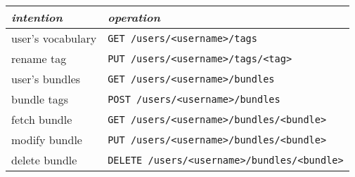 \documentclass{sepslide-soa-faked} %
\begin{document}
\begin{slide}
\begin{flushleft}
\begin{tabular}{@{}ll@{}}
\textit{intention} & \textit{operation} \\ \hline
user's vocabulary & \verb"GET /users/<username>/tags" \\
rename tag & \verb"PUT /users/<username>/tags/<tag>" \\
user's bundles & \verb"GET /users/<username>/bundles" \\
bundle tags & \verb"POST /users/<username>/bundles" \\
fetch bundle & \verb"GET /users/<username>/bundles/<bundle>" \\
modify bundle & \verb"PUT /users/<username>/bundles/<bundle>" \\
delete bundle & \verb"DELETE /users/<username>/bundles/<bundle>"
\end{tabular}
\end{flushleft}
\end{slide}

\begin{slide}
  \Listofslides
\end{slide}

\begin{slide}
  \Timetable
\end{slide}
\end{document}
